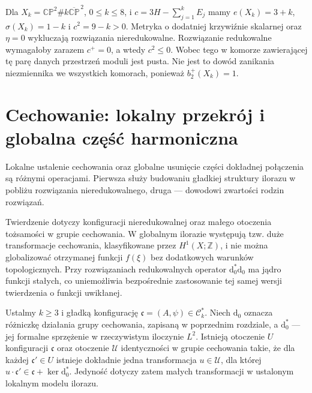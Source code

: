 \begin{przyklad}
Dla $X_k=\mathbb{CP}^2\#k\overline{\mathbb{CP}}^{\,2}$,
$0\le k\le8$, i $c=3H-\sum_{j=1}^kE_j$ mamy
$e(X_k)=3+k$, $\sigma(X_k)=1-k$ i $c^2=9-k>0$.
Metryka o dodatniej krzywiźnie skalarnej oraz $\eta=0$
wykluczają rozwiązania nieredukowalne. Rozwiązanie redukowalne
wymagałoby zarazem $c^+=0$, a wtedy $c^2\le0$.
Wobec tego w komorze zawierającej tę parę danych przestrzeń
moduli jest pusta. Nie jest to dowód zanikania niezmiennika
we wszystkich komorach, ponieważ $b_2^+(X_k)=1$.
\end{przyklad}

\section{Cechowanie: lokalny przekrój i globalna część harmoniczna}
\label{sec:tg-sw12-slice}

Lokalne ustalenie cechowania oraz globalne usunięcie części
dokładnej połączenia są różnymi operacjami. Pierwsza służy
budowaniu gładkiej struktury ilorazu w pobliżu rozwiązania
nieredukowalnego, druga --- dowodowi zwartości rodzin rozwiązań.

\begin{uwaga}
Twierdzenie dotyczy konfiguracji nieredukowalnej oraz
małego otoczenia tożsamości w grupie cechowania.
W globalnym ilorazie występują tzw. duże transformacje
cechowania, klasyfikowane przez $H^1(X;\mathbb Z)$,
i nie można globalizować otrzymanej funkcji $f(\xi)$
bez dodatkowych warunków topologicznych.
Przy rozwiązaniach redukowalnych operator
$\mathrm d_0^*\mathrm d_0$ ma jądro funkcji stałych,
co uniemożliwia bezpośrednie zastosowanie tej samej
wersji twierdzenia o funkcji uwikłanej.
\end{uwaga}

\begin{twierdzenie}
\label{thm:tg-sw12-slice}
Ustalmy $k\ge3$ i gładką konfigurację
$\mathfrak c=(A,\psi)\in\mathcal C_k^*$.
Niech $\mathrm d_0$ oznacza różniczkę działania grupy
cechowania, zapisaną w poprzednim rozdziale, a
$\mathrm d_0^*$ --- jej formalne sprzężenie w rzeczywistym
iloczynie $L^2$. Istnieją otoczenie $U$ konfiguracji $\mathfrak c$ oraz
otoczenie $\mathcal U$ identyczności w grupie cechowania
takie, że dla każdej $\mathfrak c'\in U$ istnieje
dokładnie jedna transformacja $u\in\mathcal U$,
dla której $u\cdot\mathfrak c'\in
\mathfrak c+\ker\mathrm d_0^*$.
Jedyność dotyczy zatem małych transformacji
w ustalonym lokalnym modelu ilorazu.
\end{twierdzenie}

